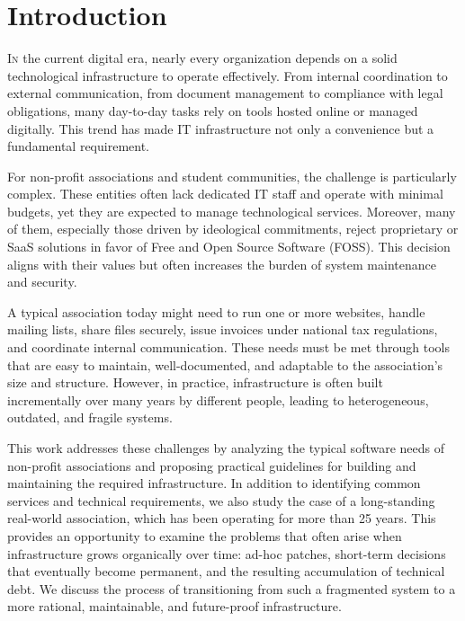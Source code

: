 %

\chapter{Introduction}
\label{chap:introduction}

\lettrine{I}{n} the current digital era, nearly every organization depends on a solid technological infrastructure to operate effectively. From internal coordination to external communication, from document management to compliance with legal obligations, many day-to-day tasks rely on tools hosted online or managed digitally. This trend has made IT infrastructure not only a convenience but a fundamental requirement.

For non-profit associations and student communities, the challenge is particularly complex. These entities often lack dedicated IT staff and operate with minimal budgets, yet they are expected to manage technological services. Moreover, many of them, especially those driven by ideological commitments, reject proprietary or SaaS solutions in favor of Free and Open Source Software (FOSS). This decision aligns with their values but often increases the burden of system maintenance and security.

A typical association today might need to run one or more websites, handle mailing lists, share files securely, issue invoices under national tax regulations, and coordinate internal communication. These needs must be met through tools that are easy to maintain, well-documented, and adaptable to the association's size and structure. However, in practice, infrastructure is often built incrementally over many years by different people, leading to heterogeneous, outdated, and fragile systems.

This work addresses these challenges by analyzing the typical software needs of non-profit associations and proposing practical guidelines for building and maintaining the required infrastructure. In addition to identifying common services and technical requirements, we also study the case of a long-standing real-world association, which has been operating for more than 25 years. This provides an opportunity to examine the problems that often arise when infrastructure grows organically over time: ad-hoc patches, short-term decisions that eventually become permanent, and the resulting accumulation of technical debt. We discuss the process of transitioning from such a fragmented system to a more rational, maintainable, and future-proof infrastructure.


